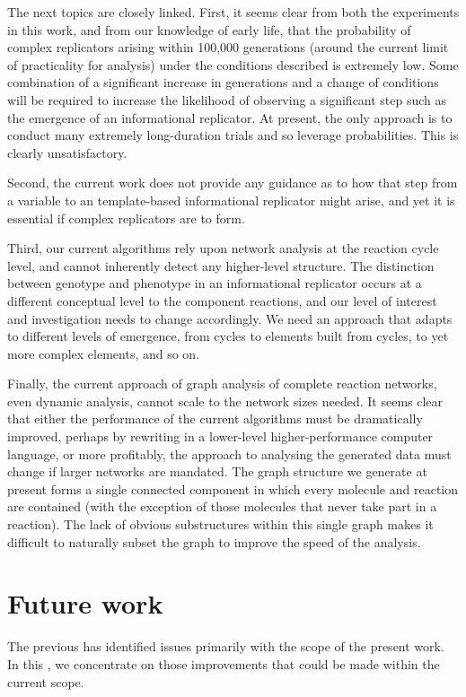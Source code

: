 The next topics are closely linked. First, it seems clear from both the experiments in this work, and from our knowledge of early life, that the probability of complex replicators arising within 100,000 generations (around the current limit of practicality for analysis) under the conditions described is extremely low. Some combination of a significant increase in generations and a change of conditions will be required to increase the likelihood of observing a significant step such as the emergence of an informational replicator. At present, the only approach is to conduct many extremely long-duration trials and so leverage probabilities. This is clearly unsatisfactory.

Second, the current work does not provide any guidance as to how that step from a variable to an template-based informational replicator might arise, and yet it is essential if complex replicators are to form. 

Third, our current algorithms rely upon network analysis at the reaction cycle level, and cannot inherently detect any higher-level structure. The distinction between genotype and phenotype in an informational replicator occurs at a different conceptual level to the component reactions, and our level of interest and investigation needs to change accordingly. We need an approach that adapts to different levels of emergence, from cycles to elements built from cycles, to yet more complex elements, and so on. 

Finally, the current approach of graph analysis of complete reaction networks, even dynamic analysis, cannot scale to the network sizes needed. It seems clear that either the performance of the current algorithms must be dramatically improved, perhaps by rewriting in a lower-level higher-performance computer language, or more profitably, the approach to analysing the generated data must change if larger networks are mandated. The graph structure we generate at present forms a single connected component in which every molecule and reaction are contained (with the exception of those molecules that never take part in a reaction). The lack of obvious substructures within this single graph makes it difficult to naturally subset the graph to improve the speed of the analysis.

\section{Future work}\label{sec:future-work}

The previous  has identified issues primarily with the scope of the present work. In this , we concentrate on those improvements that could be made within the current scope. 

